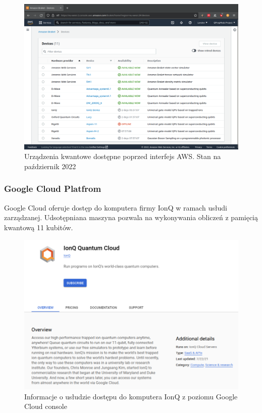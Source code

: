 \documentclass[a4paper,12pt
]{article}
\begin{document}
\begin{figure}
\centering
\includegraphics{amazon-braket-10.0222.png}
\caption{Urządzenia kwantowe dostępne poprzed interfejs AWS. Stan na
październik 2022}
\end{figure}

\hypertarget{google-cloud-platfrom}{%
\subsubsection{Google Cloud Platfrom}\label{google-cloud-platfrom}}

Google Cloud oferuje dostęp do komputera firmy IonQ w ramach usłudi
zarządzanej. Udsotępniana maszyna pozwala na wykonywania obliczeń z
pamięcią kwantową 11 kubitów.

\begin{figure}
\centering
\includegraphics{google-cloud-ionq-10.2022.png}
\caption{Informacje o usłudzie dostępu do komputera IonQ z poziomu
Google Cloud console}
\end{figure}
\end{document}
